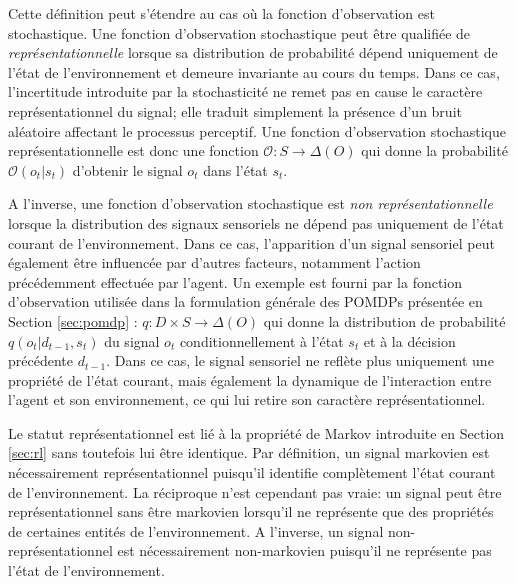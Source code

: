Cette définition peut s'étendre au cas où la fonction d'observation est stochastique.
Une fonction d'observation stochastique peut être qualifiée de \emph{représentationnelle} lorsque sa distribution de probabilité dépend uniquement de l'état de l'environnement et demeure invariante au cours du temps.
Dans ce cas, l'incertitude introduite par la stochasticité ne remet pas en cause le caractère représentationnel du signal; elle traduit simplement la présence d'un bruit aléatoire affectant le processus perceptif.
Une fonction d'observation stochastique représentationnelle est donc une fonction $\mathcal{O} : S \to \Delta(O) $ 
qui donne la probabilité  $ \mathcal{O}(o_t| s_t)$ d'obtenir le signal $o_t$ dans l'état $s_t$.


A l'inverse, une fonction d'observation stochastique est \emph{non représentationnelle} lorsque la distribution des signaux sensoriels ne dépend pas uniquement de l'état courant de l'environnement. 
Dans ce cas, l'apparition d'un signal sensoriel peut également être influencée par d'autres facteurs, notamment l'action précédemment effectuée par l'agent.
Un exemple est fourni par la fonction d'observation utilisée dans la formulation générale des POMDPs présentée en Section \ref{sec:pomdp} : $q:D\times S\rightarrow\Delta(O)$ qui donne la distribution de probabilité $q(o_{t}|d_{t-1}, s_t)$ du signal $o_{t}$ conditionnellement à l'état $s_t$ et à la décision précédente $d_{t-1}$.
Dans ce cas, le signal sensoriel ne reflète plus uniquement une propriété de l'état courant, mais également la dynamique de l'interaction entre l'agent et son environnement, ce qui lui retire son caractère représentationnel.





Le statut représentationnel est lié à la propriété de Markov introduite en Section \ref{sec:rl} sans toutefois lui être identique. 
Par définition, un signal markovien est nécessairement représentationnel puisqu'il identifie complètement l'état courant de l'environnement.
La réciproque n'est cependant pas vraie:
un signal peut être représentationnel sans être markovien lorsqu'il ne représente que des propriétés de certaines entités de l'environnement.
A l'inverse, un signal non-représentationnel est nécessairement non-markovien puisqu'il ne représente pas l'état de l'environnement.

